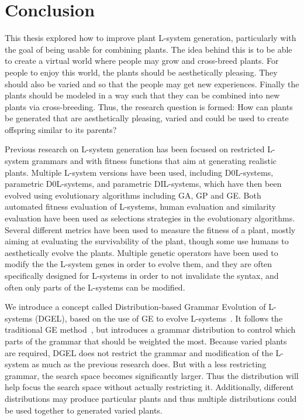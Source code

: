 \chapter{Conclusion}

This thesis explored how to improve plant \gls{L-system} generation, particularly with the goal of being usable for combining plants.
The idea behind this is to be able to create a virtual world where people may grow and cross-breed plants.
For people to enjoy this world, the plants should be aesthetically pleasing.
They should also be varied and so that the people may get new experiences.
Finally the plants should be modeled in a way such that they can be combined into new plants via cross-breeding.
Thus, the research question is formed: How can plants be generated that are aesthetically pleasing, varied and could be used to create offspring similar to its parents?

Previous research on \gls{L-system} generation has been focused on restricted \gls{L-system} grammars and with fitness functions that aim at generating realistic plants.
Multiple \gls{L-system} versions have been used, including D0L-systems, parametric D0L-systems, and parametric DIL-systems, which have then been evolved using evolutionary algorithms including \gls{GA}, \gls{GP} and \gls{GE}.
Both automated fitness evaluation of \glspl{L-system}, human evaluation and similarity evaluation have been used as selections strategies in the evolutionary algorithms.
Several different metrics have been used to measure the fitness of a plant, mostly aiming at evaluating the survivability of the plant, though some use humans to aesthetically evolve the plants.
Multiple genetic operators have been used to modify the the \gls{L-system} genes in order to evolve them, and they are often specifically designed for \glspl{L-system} in order to not invalidate the syntax, and often only parts of the \glspl{L-system} can be modified.

We introduce a concept called Distribution-based Grammar Evolution of \glspl{L-system} (DGEL), based on the use of \gls{GE} to evolve \glspl{L-system}~\cite{1998Ryan,2003Ortega,2009Beaumont}.
It follows the traditional \gls{GE} method~\cite{1998Ryan}, but introduces a grammar distribution to control which parts of the grammar that should be weighted the most.
Because varied plants are required, \gls{DGEL} does not restrict the grammar and modification of the \gls{L-system} as much as the previous research does.
But with a less restricting grammar, the search space becomes significantly larger.
Thus the distribution will help focus the search space without actually restricting it.
Additionally, different distributions may produce particular plants and thus multiple distributions could be used together to generated varied plants.

